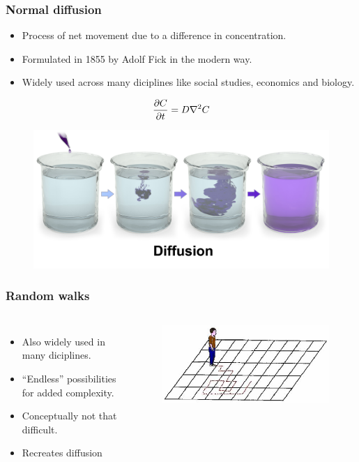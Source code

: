 
\begin{frame}
 \frametitle{Normal diffusion}
 \begin{itemize}
  \item Process of net movement due to a difference in concentration.
  \item Formulated in 1855 by Adolf Fick in the modern way.
  \item Widely used across many diciplines like social studies, economics and biology.
 \end{itemize}

 \begin{equation*}
  \frac{\partial C}{\partial t} = D\nabla^2C
 \end{equation*}
\begin{figure}[H]
 \centering
 \includegraphics[width=\textwidth]{figures/Diffusion.png}
\end{figure}

\end{frame}



\begin{frame}
 \frametitle{Random walks}
 \begin{columns}
  \begin{itemize}
   \item Also widely used in many diciplines.
   \item ``Endless'' possibilities for added complexity.
   \item Conceptually not that difficult.
   \item Recreates diffusion
  \end{itemize}
\begin{figure}[H]
\centering
\includegraphics[width=\textwidth]{figures/RW.jpg}
 \end{figure}

 \end{columns}
\end{frame}